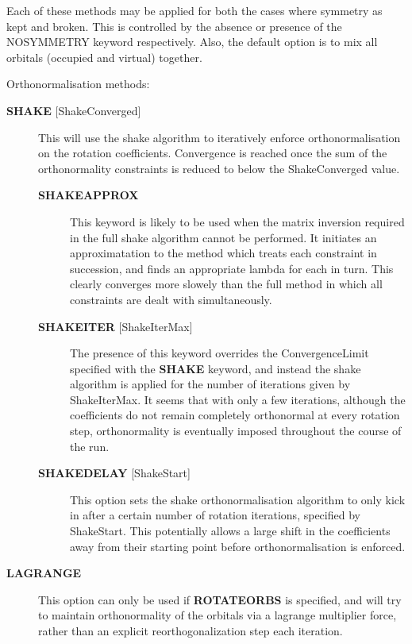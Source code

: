 \documentclass[openany,a4paper,10pt,english]{manual}
\begin{document}
Each of these methods may be applied for both the cases where symmetry as kept and broken.
This is controlled by the absence or presence of the NOSYMMETRY keyword respectively.
Also, the default option is to mix all orbitals (occupied and virtual) together.

Orthonormalisation methods:
\begin{description}
\item[\textbf{SHAKE} {[}ShakeConverged{]}] \leavevmode
This will use the shake algorithm to iteratively enforce orthonormalisation on the
rotation coefficients.
Convergence is reached once the sum of the orthonormality constraints is reduced to
below the ShakeConverged value.
\begin{description}
\item[\textbf{SHAKEAPPROX}] \leavevmode
This keyword is likely to be used when the matrix inversion required in the
full shake algorithm cannot be performed.  It initiates an approximatation to the
method which treats each constraint in succession, and finds an appropriate lambda
for each in turn.  This clearly converges more slowely than the full method in which
all constraints are dealt with simultaneously.

\item[\textbf{SHAKEITER} {[}ShakeIterMax{]}] \leavevmode
The presence of this keyword overrides the ConvergenceLimit specified with the \textbf{SHAKE}
keyword, and instead the shake algorithm is applied for the number of iterations given
by ShakeIterMax.  It seems that with only a few iterations, although the coefficients do
not remain completely orthonormal at every rotation step, orthonormality is eventually imposed
throughout the course of the run.

\item[\textbf{SHAKEDELAY} {[}ShakeStart{]}] \leavevmode
This option sets the shake orthonormalisation algorithm to only kick in after a certain number
of rotation iterations, specified by ShakeStart.  This potentially allows a large shift in
the coefficients away from their starting point before orthonormalisation is enforced.

\end{description}

\item[\textbf{LAGRANGE}] \leavevmode
This option can only be used if \textbf{ROTATEORBS} is specified, and will try to
maintain orthonormality of the orbitals via a lagrange multiplier force, rather
than an explicit reorthogonalization step each iteration.

\end{description}
\end{document}
